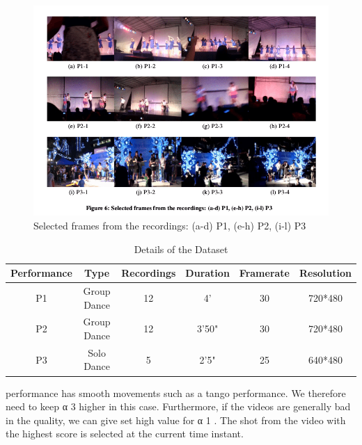 \documentclass{sig-alternate-05-2015}
\begin{document}
\begin{figure}
\centering
\includegraphics[width=125mm,height=80mm]{img.png}
\caption{Selected frames from the recordings: (a-d) P1, (e-h) P2, (i-l) P3}
\end{figure}
\begin{table}
\begin{center}
\caption{Details of the Dataset}
\begin{tabular}{|c|c|c|c|c|c|}
\hline
Performance & Type & Recordings& Duration &Framerate & Resolution\\
\hline
P1 & Group Dance & 12& 4' & 30 & 720*480\\
\hline
P2 & Group Dance & 12& 3'50"& 30 & 720*480\\
\hline
P3 & Solo Dance & 5 & 2'5"& 25 & 640*480\\
\hline

\end{tabular}
\end{center}
\end{table}

performance has smooth movements such as a tango performance.
We therefore need to keep α 3 higher in this case. Furthermore, if
the videos are generally bad in the quality, we can give set high
value for α 1 . The shot from the video with the highest score is
selected at the current time instant.
\end{document}
